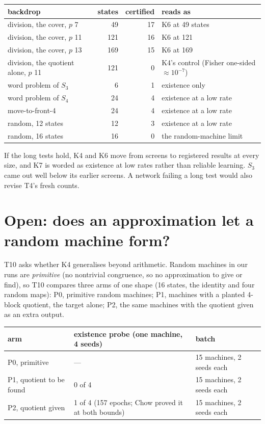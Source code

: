 \documentclass[11pt]{article}
\begin{document}
\begin{center}
\begin{tabular}{lrrl}
\toprule
backdrop & states & certified & reads as \\
\midrule
division, the cover, $p$ 7 & 49 & 17 & K6 at 49 states \\
division, the cover, $p$ 11 & 121 & 16 & K6 at 121 \\
division, the cover, $p$ 13 & 169 & 15 & K6 at 169 \\
division, the quotient alone, $p$ 11 & 121 & 0 & K4's control (Fisher one-sided $\approx 10^{-7}$) \\
word problem of $S_3$ & 6 & 1 & existence only \\
word problem of $S_4$ & 24 & 4 & existence at a low rate \\
move-to-front-4 & 24 & 4 & existence at a low rate \\
random, 12 states & 12 & 3 & existence at a low rate \\
random, 16 states & 16 & 0 & the random-machine limit \\
\bottomrule
\end{tabular}
\end{center}

If the long tests hold, K4 and K6 move from screens to registered results at every size, and K7 is
worded as existence at low rates rather than reliable learning. $S_3$ came out well below its
earlier screens. A network failing a long test would also revise T4's fresh counts.

\section{Open: does an approximation let a random machine form?}
\label{sec:open}

T10 asks whether K4 generalises beyond arithmetic. Random machines in our runs are \emph{primitive}
(no nontrivial congruence, so no approximation to give or find), so T10 compares three arms of one
shape (16 states, the identity and four random maps): P0, primitive random machines; P1, machines
with a planted 4-block quotient, the target alone; P2, the same machines with the quotient given as
an extra output.

\begin{center}
\begin{tabular}{lp{}l}
\toprule
arm & existence probe (one machine, 4 seeds) & batch \\
\midrule
P0, primitive & --- & 15 machines, 2 seeds each \\
P1, quotient to be found & 0 of 4 & 15 machines, 2 seeds each \\
P2, quotient given & 1 of 4 (157 epochs; Chow proved it at both bounds) & 15 machines, 2 seeds each \\
\bottomrule
\end{tabular}
\end{center}
\end{document}
